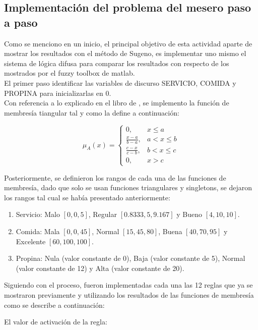\documentclass[11pt, letterpaper]{article}
\begin{document}
\newpage

\subsection{Implementación del problema del mesero paso a paso}

Como se menciono en un inicio, el principal objetivo de esta actividad aparte de mostrar los resultados con el método de Sugeno, es implementar uno mismo el sistema de lógica difusa para comparar los resultados con respecto de los mostrados por el fuzzy toolbox de matlab.\\

El primer paso  identificar las variables de discurso SERVICIO, COMIDA y PROPINA para inicializarlas en 0.\\

Con referencia a lo explicado en el libro de \cite{Cisneros2004}, se implemento la función de membresía tiangular tal y como la define a continuación:

$$
\mu_A(x) = 
\begin{cases}
	0, & x \le a \\
	\frac{x - a}{b - a}, & a < x \le b \\
	\frac{c - x}{c - b}, & b < x \le c \\
	0, & x > c
\end{cases}
$$


Posteriormente, se definieron los rangos de cada una de las funciones de membresía, dado que solo se usan funciones triangulares y singletons, se dejaron los rangos tal cual se había presentado anteriormente:


\begin{enumerate}
	\item Servicio: Malo $[0,0,5]$, Regular $[0.8333,5,9.167]$ y Bueno $[4,10,10]$.	
	\item Comida: Mala $[0,0,45]$, Normal $[15,45,80]$, Buena $[40,70,95]$ y Excelente $[60,100,100]$.
	\item Propina: Nula (valor constante de 0), Baja (valor constante de 5), Normal (valor constante de 12) y Alta (valor constante de 20).
\end{enumerate}


Siguiendo con el proceso, fueron implementadas cada una las 12 reglas que ya se mostraron previamente y utilizando los resultados de las funciones de membresía como se describe a continuación:

El valor de activación de la regla:
\end{document}
